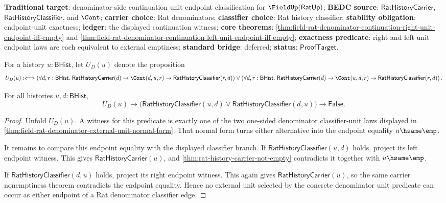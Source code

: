 \textbf{Traditional target}: denominator-side continuation unit endpoint
classification for $\FieldUp(\mathsf{RatUp})$; \textbf{BEDC source}:
$\mathsf{RatHistoryCarrier}$, $\mathsf{RatHistoryClassifier}$, and $\Cont$;
\textbf{carrier choice}: Rat denominators; \textbf{classifier choice}: Rat
history classifier; \textbf{stability obligation}: endpoint-unit exactness;
\textbf{ledger}: the displayed continuation witness; \textbf{core theorems}:
\autoref{thm:field-rat-denominator-continuation-right-unit-endpoint-iff-empty}
and
\autoref{thm:field-rat-denominator-continuation-left-unit-endpoint-iff-empty};
\textbf{exactness predicate}: right and left unit endpoint laws are each
equivalent to external emptiness;
\textbf{standard bridge}: deferred; \textbf{status}: $\mathsf{ProofTarget}$.

\begin{definition}
\label{def:field-rat-denominator-external-unit-predicate}
For a history $u:\mathsf{BHist}$, let $U_D(u)$ denote the proposition
$$
U_D(u)
:\Longleftrightarrow
\left(
\forall d,r:\mathsf{BHist}.\;
\mathsf{RatHistoryCarrier}(d)\to
\Cont(d,u,r)\to
\mathsf{RatHistoryClassifier}(r,d)
\right)
\lor
\left(
\forall d,r:\mathsf{BHist}.\;
\mathsf{RatHistoryCarrier}(d)\to
\Cont(u,d,r)\to
\mathsf{RatHistoryClassifier}(r,d)
\right).
$$
\end{definition}

\begin{theorem}
\label{thm:field-rat-denominator-external-unit-classifier-disjointness}
For all histories $u,d:\mathsf{BHist}$,
$$
U_D(u)\to
\bigl(
\mathsf{RatHistoryClassifier}(u,d)\lor
\mathsf{RatHistoryClassifier}(d,u)
\bigr)\to
\mathsf{False}.
$$
\end{theorem}
\begin{proof}
Unfold $U_D(u)$. A witness for this predicate is exactly one of the two
one-sided denominator classifier-unit laws displayed in
\autoref{thm:field-rat-denominator-external-unit-normal-form}. That normal
form turns either alternative into the endpoint equality $u\hsame\emp$.

It remains to compare this endpoint equality with the displayed classifier
branch. If $\mathsf{RatHistoryClassifier}(u,d)$ holds, project its left
endpoint witness. This gives $\mathsf{RatHistoryCarrier}(u)$, and
\autoref{thm:rat-history-carrier-not-empty} contradicts it together with
$u\hsame\emp$.

If $\mathsf{RatHistoryClassifier}(d,u)$ holds, project its right endpoint
witness. This again gives $\mathsf{RatHistoryCarrier}(u)$, so the same carrier
nonemptiness theorem contradicts the endpoint equality. Hence no external
unit selected by the concrete denominator unit predicate can occur as either
endpoint of a Rat denominator classifier edge.
\end{proof}

